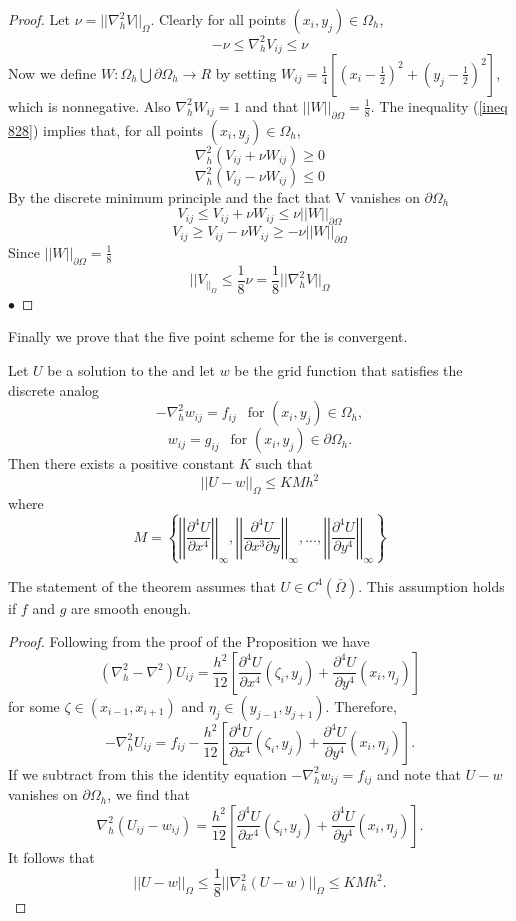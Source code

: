 \begin{proof}
Let $\nu = ||\nabla_{h}^2V||_{\Omega}$. Clearly for all points $(x_i,y_j)\in\Omega_h$,
\begin{equation}\label{ineq 828}
-\nu \leq \nabla_{h}^2V_{ij} \leq \nu \end{equation}
Now we define $W:\Omega_h \bigcup \partial\Omega_h \rightarrow R$ by setting 
$W_{ij}=\frac{1}{4}[(x_i-\frac{1}{2})^2+(y_j-\frac{1}{2})^2]$, which is nonnegative.  Also $\nabla_h^2W_{ij}=1$ and that $||W||_{\partial\Omega}=\frac{1}{8}$.
The inequality (\ref{ineq 828}) implies that, for all points $(x_i,y_j)\in\Omega_h$,
\[\nabla_h^2(V_{ij}+\nu W_{ij})\geq 0 \]
\[\nabla_h^2(V_{ij}-\nu W_{ij})\leq 0 \]
By the discrete minimum principle and the fact that V vanishes on $\partial\Omega_h$
\[V_{ij}\leq V_{ij}+\nu W_{ij}\leq \nu||W||_{\partial\Omega} \]
\[V_{ij}\geq V_{ij}-\nu W_{ij}\geq -\nu||W||_{\partial\Omega} \]
Since $||W||_{\partial\Omega}=\frac{1}{8}$
\[||V_||_{\Omega}\leq \frac{1}{8}\nu =\frac{1}{8}||\nabla_h^2V||_{\Omega} \]
$\bullet$\end{proof}
Finally we prove that the five point scheme for the  is convergent.
\begin{theorem}
Let $U$ be a solution to the  and let $w$ be the grid function
that satisfies the discrete analog
\[-\nabla_h^2w_{ij}=f_{ij} \ \ \mbox{ for } (x_i,y_j)\in\Omega_h, \]
\[w_{ij}=g_{ij} \ \ \mbox{ for } (x_i,y_j)\in\partial\Omega_h. \]
Then there exists a positive constant $K$ such that
\[||U-w||_{\Omega}\leq KMh^2 \]
where
\[ M=\left\{
\left|\left|\frac{\partial^4 U}{\partial x^4} \right|\right|_{\infty},
\left|\left|\frac{\partial^4 U}{\partial x^3\partial y} \right|\right|_{\infty},
...,
\left|\left|\frac{\partial^4 U}{\partial y^4} \right|\right|_{\infty}
 \right\}
\]
\end{theorem}
The statement of the theorem assumes that $U\in C^4(\bar{\Omega})$. This assumption
holds if $f$ and $g$ are smooth enough.
\begin{proof}
Following from the proof of the Proposition we have
\[ (\nabla_h^2-\nabla^2)U_{ij}=\frac{h^2}{12}\left[ \frac{\partial^4 U}{\partial x^4}(\zeta_i,y_j)+\frac{\partial^4 U}{\partial y^4}(x_i,\eta_j) \right]\]
for some $\zeta \in (x_{i-1},x_{i+1})$ and $\eta_j\in(y_{j-1},y_{j+1})$.  Therefore,
\[ -\nabla_h^2U_{ij}=f_{ij}-\frac{h^2}{12}\left[ \frac{\partial^4 U}{\partial x^4}(\zeta_i,y_j)+\frac{\partial^4 U}{\partial y^4}(x_i,\eta_j) \right].\]
If we subtract from this the identity equation $-\nabla_h^2w_{ij}=f_{ij}$ and note
that $U-w$ vanishes on $\partial\Omega_h$, we find that
\[ \nabla_h^2(U_{ij}-w_{ij})=\frac{h^2}{12}\left[ \frac{\partial^4 U}{\partial x^4}(\zeta_i,y_j)+\frac{\partial^4 U}{\partial y^4}(x_i,\eta_j) \right].\]
It follows that
\[ ||U-w||_{\Omega}\leq\frac{1}{8}||\nabla_h^2(U-w)||_{\Omega}\leq KMh^2.\]
\end{proof}